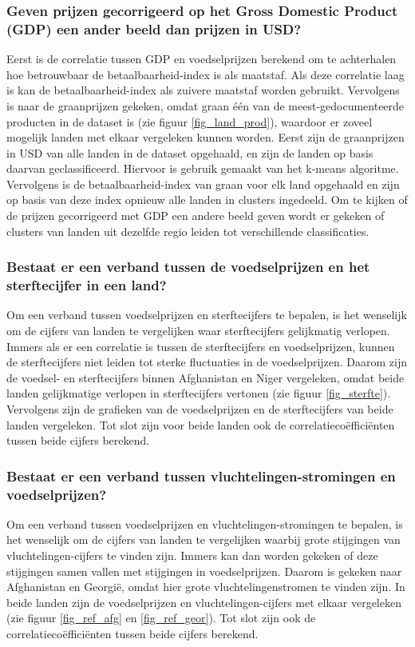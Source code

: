 \documentclass{article}
\begin{document}
\subsubsection*{Geven prijzen gecorrigeerd op het Gross Domestic Product (GDP) een ander beeld dan prijzen in USD?}
Eerst is de correlatie tussen GDP en voedselprijzen berekend om te achterhalen hoe betrouwbaar de betaalbaarheid-index is als maatstaf. Als deze correlatie laag is kan de betaalbaarheid-index als zuivere maatstaf worden gebruikt. 
Vervolgens is naar de graanprijzen gekeken, omdat graan één van de meest-gedocumenteerde producten in de dataset is (zie figuur \ref{fig_land_prod}), waardoor er zoveel mogelijk landen met elkaar vergeleken kunnen worden.
Eerst zijn de graanprijzen in USD van alle landen in de dataset opgehaald, en zijn de landen op basis daarvan geclassificeerd. Hiervoor is gebruik gemaakt van het k-means algoritme. Vervolgens is de betaalbaarheid-index van graan voor elk land opgehaald en zijn op basis van deze index opnieuw alle landen in clusters ingedeeld. Om te kijken of de prijzen gecorrigeerd met GDP een andere beeld geven wordt er gekeken of clusters van landen uit dezelfde regio leiden tot verschillende classificaties.


\subsubsection*{Bestaat er een verband tussen de voedselprijzen en het sterftecijfer in een land?}

Om een verband tussen voedselprijzen en sterftecijfers te bepalen, is het wenselijk om de cijfers van landen te vergelijken waar sterftecijfers gelijkmatig verlopen. Immers als er een correlatie is tussen de sterftecijfers en voedselprijzen, kunnen de sterftecijfers niet leiden tot sterke fluctuaties in de voedselprijzen. Daarom zijn de voedsel- en sterftecijfers binnen Afghanistan en Niger vergeleken, omdat beide landen gelijkmatige verlopen in sterftecijfers vertonen (zie figuur \ref{fig_sterfte}). Vervolgens zijn de grafieken van de voedselprijzen en de sterftecijfers van beide landen vergeleken. Tot slot zijn voor beide landen ook de correlatiecoëfficiënten tussen beide cijfers berekend.

\subsubsection*{Bestaat er een verband tussen vluchtelingen-stromingen en voedselprijzen?}
Om een verband tussen voedselprijzen en vluchtelingen-stromingen te bepalen, is het wenselijk om de cijfers van landen te vergelijken waarbij grote stijgingen van vluchtelingen-cijfers te vinden zijn. Immers kan dan worden gekeken of deze stijgingen samen vallen met stijgingen in voedselprijzen. Daarom is gekeken naar Afghanistan en Georgië, omdat hier grote vluchtelingenstromen te vinden zijn.
In beide landen zijn de voedselprijzen en vluchtelingen-cijfers met elkaar vergeleken (zie figuur \ref{fig_ref_afg} en \ref{fig_ref_geor}). Tot slot zijn ook de correlatiecoëfficiënten tussen beide cijfers berekend.
\end{document}
